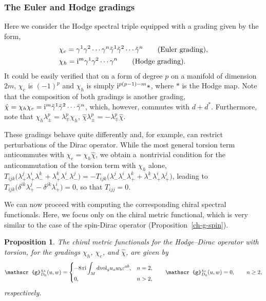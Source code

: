 \documentclass[pdftex]{sigma}
\numberwithin{equation}{section}
\newtheorem{Proposition}[Theorem]{Proposition}
\theoremstyle{definition}
\def\dv{\mathrm{dvol}_g}
\begin{document}
\subsubsection{The Euler and Hodge gradings}
Here we consider the Hodge spectral triple equipped with a grading given by the form,
\begin{align*}
 &\chi_e= \gamma^1 \gamma^2 \cdots \gamma^n \tilde{\gamma}^1 \tilde{\gamma}^2 \cdots \tilde{\gamma}^n \qquad
 \hbox{(Euler grading)}, \\
 &\chi_h ={\rm i}^m \gamma^1 \gamma^2 \cdots \gamma^n
 \qquad \hbox{(Hodge grading)}.
\end{align*}
It could be easily verified that on a form of degree $p$ on a manifold of dimension $2m$, $\chi_e$ is $(-1)^p$ and $\chi_h$ is simply ${\rm i}^{p(p-1)-m} \ast$, where $\ast$ is the Hodge map. Note that the composition of both gradings is another grading, $\hat{\chi}=\chi_h\chi_e={\rm i}^m \tilde{\gamma}^1 \tilde{\gamma}^2 \cdots \tilde{\gamma}^n$, which, however, commutes with $d+d^\ast$.
Furthermore, note that
$
\chi_h \lambda_\pm^p = \lambda_\mp^p \chi_h$,
$
\hat{\chi} \lambda_\pm^p = -\lambda_\mp^p \hat{\chi}$.

These gradings behave quite differently and, for example, can restrict perturbations of the Dirac operator. While the most general torsion term anticommutes with $\chi_e = \chi_h \hat{\chi}$, we obtain a~nontrivial condition for the anticommutation of the torsion term with $\chi_h$ alone, $T_{ijk} \bigl(\lambda^j_+ \lambda^i_+ \lambda^k_- + \lambda^k_+ \lambda^i_- \lambda^j_-\bigr) = - T_{ijk} \bigl(\lambda^j_- \lambda^i_- \lambda^k_+ + \lambda^k_- \lambda^i_+ \lambda^j_+\bigr)$, leading to $T_{ijk} \bigl(\delta^{ik} \lambda^j_+ - \delta^{jk} \lambda^i_+\bigr) = 0$, so that $T_{ijj}=0$.

We can now proceed with computing the corresponding chiral spectral functionals. Here, we focus only on the chiral metric functional, which is very similar to the case of the spin-Dirac operator (Proposition~\ref{ch-g-spin}).
\begin{Proposition}
	The chiral metric functionals for the Hodge--Dirac operator with torsion, for the gradings $\chi_h$, $\chi_e$, and $\hat{\chi}$, are given by
 \begin{gather*}
 \mathscr{g}_{D_0}^{\chi_h}(u,w)=
 \begin{cases}
 \displaystyle -8\pi {\rm i}\int_M\dv u_a w_b \varepsilon^{ab}, & n=2,\\
 0, & n>2,
 \end{cases}
\qquad
 \mathscr{g}_{D_0}^{\chi_e}(u,w)= 0, \qquad n\geq 2,
 \end{gather*}
 respectively.
\end{Proposition}
\end{document}
